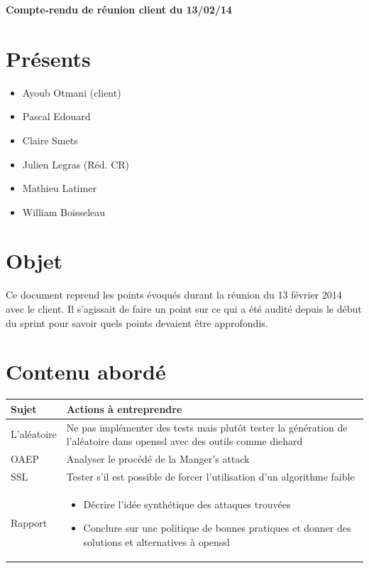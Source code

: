 \documentclass[a4paper,11pt,french]{article}
\author{\hmwkAuthorName}
\date{} %
\newcommand{\hmwkDocName}{Compte-rendu de réunion client du 13/02/14} %
\begin{document}
\pagestyle{fancy}

\begin{center}\textbf{\Huge{\hmwkDocName}}\end{center}
	
\section{Présents}
\begin{itemize}
\item Ayoub Otmani (client)
\item Pascal Edouard 
\item Claire Smets
\item Julien Legras (Réd. CR) 
\item Mathieu Latimer
\item William Boisseleau
\end{itemize}

\section{Objet}
Ce document reprend les points évoqués durant la réunion du 13 février 2014 avec le client. Il s'agissait de faire un point sur ce qui a été audité depuis le début du sprint pour savoir quels points devaient être approfondis.

\section{Contenu abordé}
\begin{center}

\begin{tabular}{ | l | p{14cm} |}
	\hline
   \textbf{Sujet} & \textbf{Actions à entreprendre}    \\ \hline
L'aléatoire & Ne pas implémenter des tests mais plutôt tester la génération de l'aléatoire dans openssl avec des outils comme diehard\\ \hline
OAEP & Analyser le procédé de la Manger's attack\\ \hline
SSL & Tester s'il est possible de forcer l'utilisation d'un algorithme faible\\ \hline
Rapport & \begin{itemize}\item Décrire l'idée synthétique des attaques trouvées \item Conclure sur une politique de bonnes pratiques et donner des solutions et alternatives à openssl\end{itemize}\\
 \hline
 \end{tabular}
 
\end{center}
\end{document}
